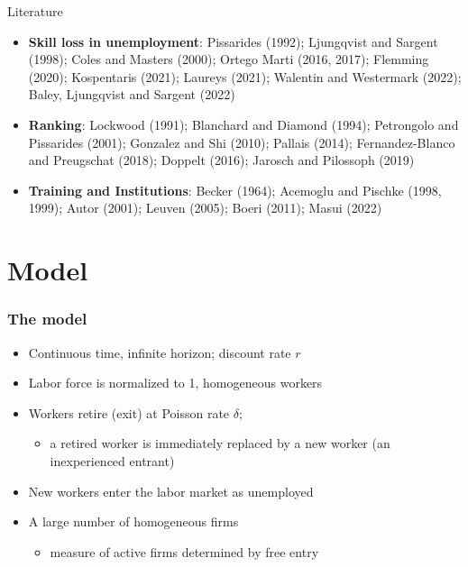 \documentclass[9pt,xcolor={svgnames}]{beamer}
\begin{document}
\begin{frame}{Literature}
\begin{itemize}
\setlength\itemsep{1.8em}
   \item \textbf{Skill loss in unemployment}: Pissarides (1992); Ljungqvist and Sargent (1998); Coles and Masters (2000); Ortego Marti (2016, 2017); Flemming (2020); Kospentaris (2021); Laureys (2021); Walentin and Westermark (2022); Baley, Ljungqvist and Sargent (2022)  
   
   \item \textbf{Ranking}: Lockwood (1991); Blanchard and Diamond (1994); Petrongolo and Pissarides (2001); Gonzalez and Shi (2010); Pallais (2014); Fernandez-Blanco and Preugschat (2018); Doppelt (2016); Jarosch and Pilossoph (2019)

   \item \textbf{Training and Institutions}: Becker (1964); Acemoglu and Pischke (1998, 1999); Autor (2001); Leuven (2005); Boeri (2011); Masui (2022)
   \end{itemize}
\end{frame}

\section{Model} 

\begin{frame}

\frametitle{The model}

\begin{itemize}

\setlength\itemsep{1.8em}

\item Continuous time, infinite horizon; discount rate $r$

\item Labor force is normalized to 1, homogeneous workers

\item Workers retire (exit) at Poisson rate $\delta$;
\begin{itemize}
\smallskip
\item a retired worker is immediately replaced by a new worker (an inexperienced entrant)  
\end{itemize}


\item New workers enter the labor market as unemployed 
 

\item A large number of homogeneous firms

\begin{itemize}
\smallskip
\item  measure of active firms determined by free entry
\end{itemize}

\end{itemize}

\end{frame}
\end{document}
